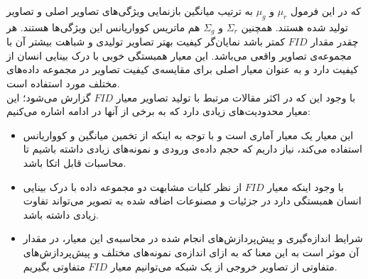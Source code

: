 که در این فرمول $\mu_r$ و $\mu_g$ به ترتیب میانگین بازنمایی ویژگی‌های تصاویر اصلی و تصاویر تولید شده هستند. همچنین $\Sigma_r$ و $\Sigma_g$ هم ماتریس کوواریانس این ویژگی‌ها هستند. هر چقدر مقدار $FID$ کمتر باشد نمایان‌گر کیفیت بهتر تصاویر تولیدی و شباهت بیشتر آن با مجموعه‌ی تصاویر واقعی می‌باشد. این معیار همبستگی خوبی با درک بینایی انسان از کیفیت دارد و به عنوان معیار اصلی برای مقایسه‌ی کیفیت تصاویر در مجموعه داده‌های مختلف مورد استفاده است.
\\
با وجود این که در اکثر مقالات مرتبط با تولید تصاویر معیار $FID$ گزارش می‌شود؛ این معیار محدودیت‌های زیادی دارد که به برخی از آنها در ادامه اشاره می‌کنیم:
\begin{itemize}
	\item این معیار یک معیار آماری است و با توجه به اینکه از تخمین میانگین و کوواریانس استفاده می‌کند، نیاز داریم که حجم داده‌ی ورودی و نمونه‌های زیادی داشته باشیم تا محاسبات قابل اتکا باشد.
	
	\item با وجود اینکه معیار $FID$ از نظر کلیات مشابهت دو مجموعه داده با درک بینایی انسان همبستگی دارد در جزئیات و مصنوعات اضافه شده به تصویر می‌تواند تفاوت زیادی داشته باشد.
	
	\item شرایط اندازه‌گیری و پیش‌پردازش‌های انجام شده در محاسبه‌ی این معیار، در مقدار آن موثر است به این معنا که به ازای اندازه‌ی نمونه‌های مختلف و پیش‌پردازش‌های متفاوتی از تصاویر خروجی  از یک شبکه می‌توانیم معیار $FID$ متفاوتی بگیریم.

\end{itemize}

